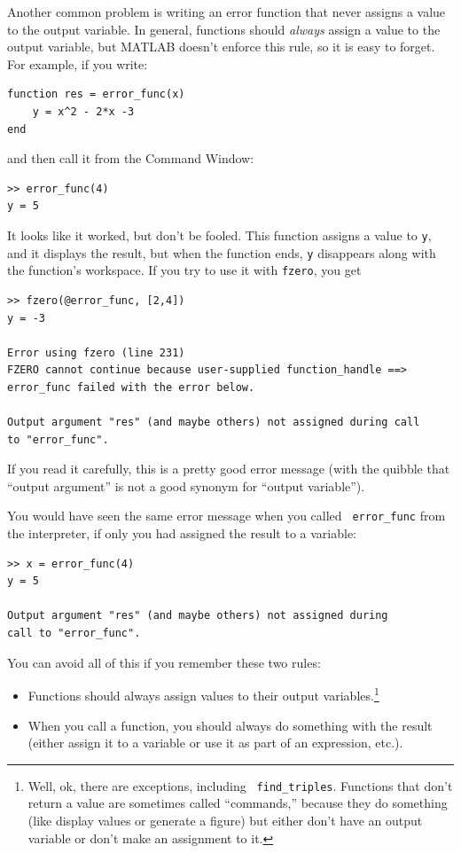 \documentclass[
]{book}
\begin{document}
Another common problem is writing an error function that never
assigns a value to the output variable.  In general, functions should
{\em always} assign a value to the output variable, but MATLAB doesn't
enforce this rule, so it is easy to forget.  For example, if you
write:

\begin{verbatim}
function res = error_func(x)
    y = x^2 - 2*x -3
end
\end{verbatim}

and then call it from the Command Window:

\begin{verbatim}
>> error_func(4)
y = 5
\end{verbatim}

It looks like it worked, but don't be fooled.  This function assigns
a value to {\tt y}, and it displays the result, but when the function
ends, {\tt y} disappears along with the function's workspace.
If you try to use it with {\tt fzero}, you get

\begin{verbatim}
>> fzero(@error_func, [2,4])
y = -3

Error using fzero (line 231)
FZERO cannot continue because user-supplied function_handle ==>
error_func failed with the error below.

Output argument "res" (and maybe others) not assigned during call
to "error_func".
\end{verbatim}

If you read it carefully, this is a pretty good error message
(with the quibble that ``output argument'' is not a good synonym
for ``output variable'').

You would have seen the same error message when you called {\tt
error\_func} from the interpreter, if only you had assigned the result
to a variable:

\begin{verbatim}
>> x = error_func(4)
y = 5

Output argument "res" (and maybe others) not assigned during
call to "error_func".
\end{verbatim}

You can avoid all of this if you remember these two rules:

\begin{itemize}

\item Functions should always assign values to their output
variables.\footnote{Well, ok, there are exceptions, including {\tt
find\_triples}. Functions that don't return a value are sometimes
called ``commands,'' because they do something (like display
values or generate a figure) but either don't have an output
variable or don't make an assignment to it.}

\item When you call a function, you should always do something with
the result (either assign it to a variable or use it as part of an
expression, etc.).

\end{itemize}
\end{document}
